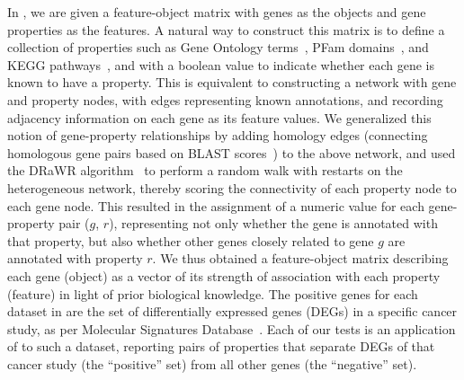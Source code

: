 In \msig, 
we are given a feature-object 
matrix with genes as the objects 
and gene properties as the features. 
A natural way to construct this matrix 
is to define a collection of properties 
such as Gene Ontology terms~\cite{gene2014gene}, 
PFam domains~\cite{finn2015pfam}, 
and KEGG pathways~\cite{kanehisa2016kegg}, 
and with a boolean value 
to indicate whether each gene is known to have a property. 
This is equivalent to constructing a network 
with gene and property nodes, with edges representing 
known annotations, and recording adjacency information 
on each gene as its feature values. 
We generalized this notion of gene-property 
relationships by adding homology edges 
(connecting homologous gene pairs based on BLAST scores~\cite{altschul1990basic}) 
to the above network, and used the DRaWR algorithm~\cite{blatti2016characterizing} 
to perform a random walk with restarts 
on the heterogeneous network, 
thereby scoring the connectivity of each property node 
to each gene node. 
This resulted in the assignment of a numeric value 
for each gene-property pair ($g$, $r$), 
representing not only whether the gene is 
annotated with that property, 
but also whether other genes closely 
related to gene $g$ are annotated with property $r$. 
We thus obtained a feature-object matrix describing 
each gene (object) as a vector of its strength of 
association with each property (feature) 
in light of prior biological knowledge.
The positive genes for each dataset in \msig 
are the set of differentially expressed genes (DEGs) 
in a specific cancer study, 
as per Molecular Signatures Database~\cite{subramanian2005gene}. 
Each of our tests is an application of 
\genviz to such a dataset, 
reporting pairs of properties 
that separate DEGs of that cancer study (the ``positive'' set) 
from all other genes (the ``negative'' set).

